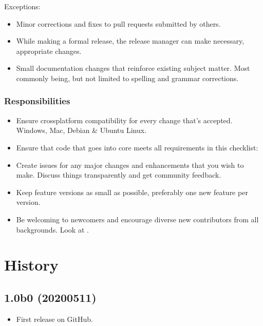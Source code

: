 \documentclass[letterpaper,10pt,english]{sphinxmanual}
\begin{document}
Exceptions:
\begin{itemize}
\item {} 
Minor corrections and fixes to pull requests submitted by others.

\item {} 
While making a formal release, the release manager can make necessary, appropriate changes.

\item {} 
Small documentation changes that reinforce existing subject matter. Most commonly being, but not limited to spelling and grammar corrections.

\end{itemize}


\subsubsection{Responsibilities}
\label{\detokenize{MANIFEST:responsibilities}}\begin{itemize}
\item {} 
Ensure cross\sphinxhyphen{}platform compatibility for every change that’s accepted. Windows, Mac, Debian \& Ubuntu Linux.

\item {} 
Ensure that code that goes into core meets all requirements in this checklist: 

\item {} 
Create issues for any major changes and enhancements that you wish to make. Discuss things transparently and get community feedback.

\item {} 
Keep feature versions as small as possible, preferably one new feature per version.

\item {} 
Be welcoming to newcomers and encourage diverse new contributors from all backgrounds. Look at .

\end{itemize}


\section{History}
\label{\detokenize{MANIFEST:history}}

\subsection{1.0b0 (2020\sphinxhyphen{}05\sphinxhyphen{}11)}
\label{\detokenize{MANIFEST:b0-2020-05-11}}\begin{itemize}
\item {} 
First release on GitHub.

\end{itemize}
\end{document}
